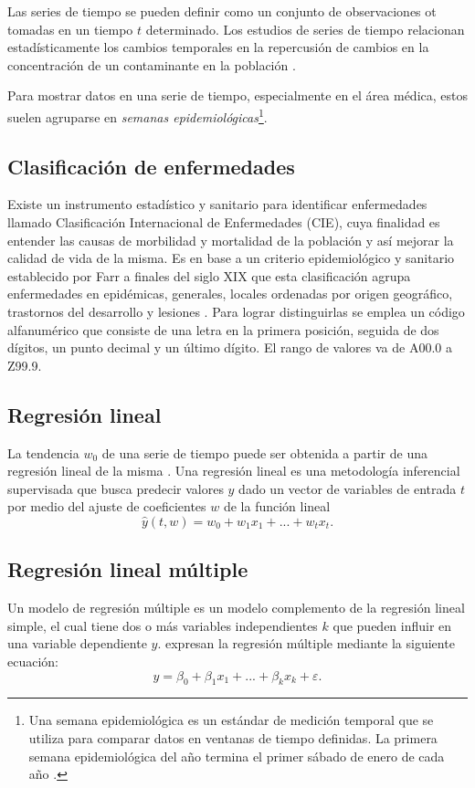 \documentclass[3p,times]{elsarticle}
\begin{document}
Las series de tiempo se pueden definir como un conjunto de observaciones {{ot}} tomadas en un tiempo $t$ determinado. Los estudios de series de tiempo relacionan estadísticamente los cambios temporales en la repercusión de cambios en la concentración de un contaminante en la población \citep{r8}.

Para mostrar datos en una serie de tiempo, especialmente en el área médica, estos suelen agruparse en \emph{semanas epidemiológicas}\footnote{Una semana epidemiológica es un estándar de medición temporal que se utiliza para comparar datos en ventanas de tiempo definidas. La primera semana epidemiológica del año termina el primer sábado de enero de cada año \citep{r7}.}. 

\subsection{Clasificación de enfermedades}
Existe un instrumento estadístico y sanitario para identificar enfermedades llamado Clasificación Internacional de Enfermedades (CIE), cuya finalidad es entender las causas de morbilidad y mortalidad de la población y así mejorar la calidad de vida de la misma. Es en base a un criterio epidemiológico y sanitario establecido por Farr a finales del siglo XIX que esta clasificación agrupa enfermedades en epidémicas, generales, locales ordenadas por origen geográfico, trastornos del desarrollo y lesiones \citep{r9}. Para lograr distinguirlas se emplea un código alfanumérico que consiste de una letra en la primera posición, seguida de dos dígitos, un punto decimal y un último dígito. El rango de valores va de A00.0 a Z99.9.

\subsection{Regresión lineal}
La tendencia $w_0$ de una serie de tiempo puede ser obtenida a partir de una regresión lineal de la misma \citep{r10}. Una regresión lineal es una metodología inferencial supervisada que busca predecir valores $y$ dado un vector de variables de entrada $t$ por medio del ajuste de coeficientes $w$ de la función lineal 
\begin{equation}
    \hat{y}(t,w) = w_0 + w_1x_1 + ... + w_tx_t.
    \label{eq1}
\end{equation}

\subsection{Regresión lineal múltiple}
Un modelo de regresión múltiple es un modelo complemento de la regresión lineal simple, el cual tiene dos o más variables independientes $k$ que pueden influir en una variable dependiente $y$. \citet{r11} expresan la regresión múltiple mediante la siguiente ecuación:
\begin{equation}
    y = \beta_0 + \beta_1x_1 + ... + \beta_kx_k + \varepsilon.
    \label{eq2}
\end{equation}
\end{document}
